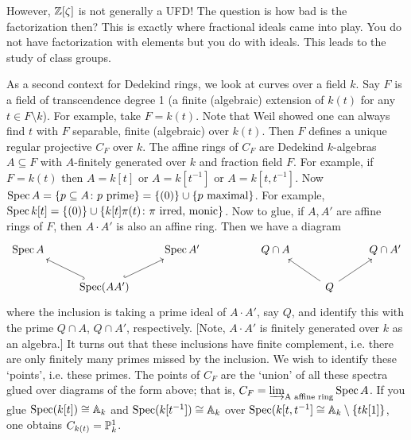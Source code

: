 However, $\Z[\zeta]$ is not generally a UFD! The question is how bad is the factorization then? This is exactly where fractional ideals came into play. You do not have factorization with elements but you do with ideals. This leads to the study of class groups. 


As a second context for Dedekind rings, we look at curves over a field $k$. Say $F$ is a field of transcendence degree 1 (a finite (algebraic) extension of $k(t)$ for any $t \in F\setminus k$). For example, take $F=k(t)$. Note that Weil showed one can always find $t$ with $F$ separable, finite (algebraic) over $k(t)$. Then $F$ defines a unique regular projective $C_F$ over $k$. The affine rings of $C_F$ are Dedekind $k$-algebras $A \subseteq F$ with $A$-finitely generated over $k$ and fraction field $F$. For example, if $F=k(t)$ then $A=k[t]$ or $A=k[t^{-1}]$ or $A=k[t,t^{-1}]$. Now $\Spec A=\{p\subseteq A \colon p \text{ prime}\}=\{(0)\} \cup \{p \text{ maximal}\}$. For example, $\Spec k[t]=\{(0)\} \cup \{k[t]\pi(t) \colon \pi \text{ irred, monic}\}$. Now to glue, if $A,A'$ are affine rings of $F$, then $A\cdot A'$ is also an affine ring. Then we have a diagram 
	\[
	\begin{tikzcd}
	\Spec A & & \Spec A' & & Q \cap A & & Q \cap A' \\
	& \Spec(AA') \arrow[hook]{ul} \arrow[hook]{ur} & & & & Q \arrow{ul} \arrow{ur} &
	\end{tikzcd}
	\]
where the inclusion is taking a prime ideal of $A\cdot A'$, say $Q$, and identify this with the prime $Q \cap A$, $Q \cap A'$, respectively. [Note, $A \cdot A'$ is finitely generated over $k$ as an algebra.] It turns out that these inclusions have finite complement, i.e. there are only finitely many primes missed by the inclusion. We wish to identify these `points', i.e. these primes. The points of $C_F$ are the `union' of all these spectra glued over diagrams of the form above; that is, $C_F= \varinjlim_{\text{A affine ring}} \Spec A$. If you glue $\Spec(k[t]) \cong \A_k$ and $\Spec(k[t^{-1}]) \cong \A_k$ over $\Spec(k[t,t^{-1}] \cong \A_k \setminus \{tk[1]\}$, one obtains $C_{k(t)} = \P^1_k$.  



